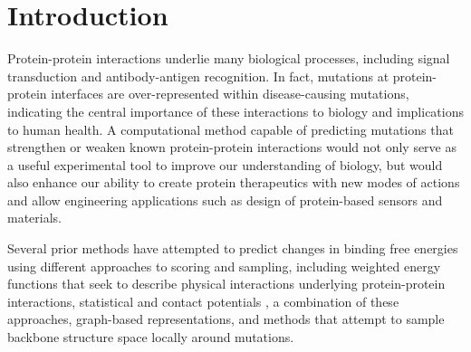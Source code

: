 \section{Introduction}

Protein-protein interactions underlie many biological processes, including signal transduction and antibody-antigen recognition.
In fact, mutations at protein-protein interfaces are over-represented within disease-causing mutations\cite{jubb_mutations_2017}, indicating the central importance of these interactions to biology and implications to human health.
A computational method capable of predicting mutations that strengthen or weaken known protein-protein interactions would not only serve as a useful experimental tool to improve our understanding of biology, but would also enhance our ability to create protein therapeutics with new modes of actions and allow engineering applications such as design of protein-based sensors and materials.

Several prior methods have attempted to predict changes in binding free energies using different approaches to scoring and sampling,
including weighted energy functions that seek to describe physical interactions underlying protein-protein interactions\cite{guerois_predicting_2002,kamisetty_accounting_2011},
statistical and contact potentials \cite{dehouck_beatmusic:_2013,moal_intermolecular_2013,vangone_contacts-based_2015,brender_predicting_2015},
a combination of these approaches\cite{li_predicting_2014},
graph-based representations\cite{pires_mcsm:_2014},
and methods that attempt to sample backbone structure space locally around mutations\cite{dourado_multiscale_2014}.

